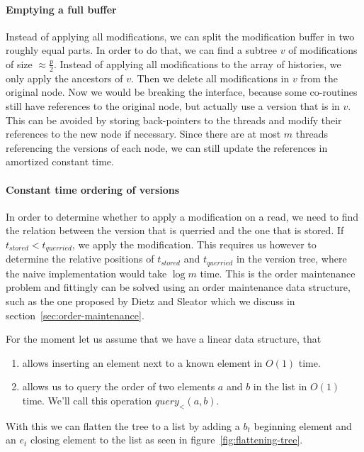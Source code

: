 \documentclass[11pt,a4paper,twoside,openright]{Thesis}
\theoremstyle{definition}
\newcommand{\Figref}[1]{figure~\ref{fig:#1}}
\newcommand{\Secref}[1]{section~\ref{sec:#1}}
\begin{document}
\paragraph{Emptying a full buffer} Instead of applying all modifications, we
can split the modification buffer in two roughly equal parts. In order to do
that, we can find a subtree $v$ of modifications of size $\approx \frac{p}{2}$.
Instead of applying all modifications to the array of histories, we only
apply the ancestors of $v$. Then we delete all modifications in $v$ from the
original node. Now we would be breaking the interface, because some
co-routines still have references to the original node, but actually use a
version that is in $v$. This can be avoided by storing back-pointers to the
threads and modify their references to the new node if necessary. Since there
are at most $m$ threads referencing the versions of each node, we can still
update the references in amortized constant time.

\paragraph{Constant time ordering of versions}
In order to determine whether to apply a modification on a read, we need to
find the relation between the version that is querried and the one that is
stored. If $t_{stored} < t_{querried}$, we apply the modification. This
requires us however to determine the relative positions of $t_{stored}$ and
$t_{querried}$ in the version tree, where the naive implementation would take
$\log m$ time. This is the order maintenance problem and fittingly can be
solved using an order maintenance data structure, such as the one proposed by
Dietz and Sleator\cite{Diet87b} which we discuss in \Secref{order-maintenance}.

For the moment let us assume that we have a linear data structure, that
\begin{enumerate}
  \item allows inserting an element next to a known element in $O(1)$ time.
  \item allows us to query the order of two elements $a$ and $b$ in the list
    in $O(1)$ time. We'll call this operation $query_<(a, b)$.
\end{enumerate}

With this we can flatten the tree to a list by adding a $b_t$ beginning
element and an $e_t$ closing element to the list as seen in
\Figref{flattening-tree}.
\end{document}
